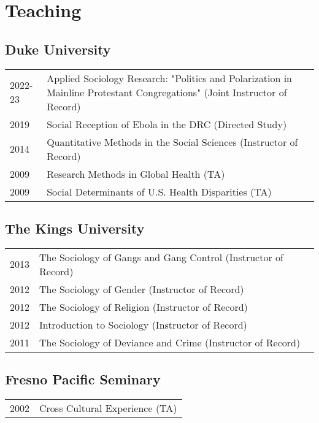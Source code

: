 \section*{Teaching}
\subsection*{Duke University}

\begin{tabular}{p{} p{}}
2022-23 & Applied Sociology Research: "Politics and Polarization in Mainline Protestant Congregations" (Joint Instructor of Record)\\
2019 & Social Reception of Ebola in the DRC (Directed Study) \\
2014 & Quantitative Methods in the Social Sciences (Instructor of Record)\\
2009 & Research Methods in Global Health (TA) \\
2009 & Social Determinants of U.S. Health Disparities (TA)\\
\end{tabular}

\subsection*{The Kings University}

\begin{tabular}{p{} p{}}
2013 & The Sociology of Gangs and Gang Control (Instructor of Record)\\
2012 & The Sociology of Gender (Instructor of Record)\\
2012 & The Sociology of Religion (Instructor of Record)\\
2012 & Introduction to Sociology (Instructor of Record)\\
2011 & The Sociology of Deviance and Crime (Instructor of Record)\\
\end{tabular}

\subsection*{Fresno Pacific Seminary}

\begin{tabular}{p{} p{}}
2002 & Cross Cultural Experience (TA) \\
\end{tabular}
\vspace{-1em}